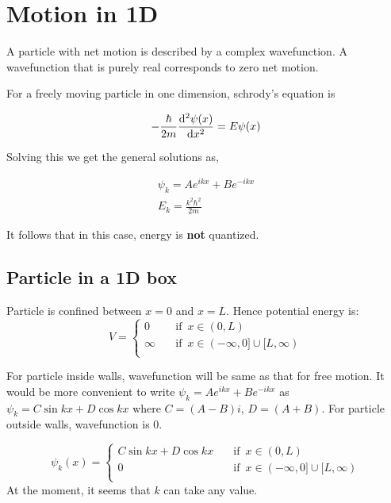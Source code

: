 \documentclass[11pt]{article}
\theoremstyle{definition}
\begin{document}
\section{Motion in 1D}

A particle with net motion is described by a complex wavefunction. A wavefunction that is purely real corresponds to zero net motion.

For a freely moving particle in one dimension, schrody's equation is

\begin{shaded}
\begin{equation*}
    - \frac{\hbar}{2m} \dv[2]{\psi(x)}{x} = E \psi(x)
\end{equation*}

Solving this we get the general solutions as,

\begin{gather*}
    \psi_k = Ae^{ikx} + Be^{-ikx}\\
    E_k = \frac{k^2 \hbar^2}{2m}
\end{gather*}
\end{shaded}

It follows that in this case, energy is \textbf{not} quantized.

\subsection{Particle in a 1D box}

Particle is confined between $x=0$ and $x=L$. Hence potential energy is:
\begin{equation*}
V=\begin{cases}
          0 \quad &\text{if } \, x \in (0,L) \\
          \infty \quad &\text{if } \, x \in (-\infty,0] \cup [L, \infty) \\
     \end{cases}
\end{equation*}

For particle inside walls, wavefunction will be same as that for free motion. It would be more convenient to write $\psi_k =Ae^{ikx} + Be^{-ikx}$ as $\psi_k = C\sin{kx} + D \cos{kx}$ where $C = (A-B)i$, $D = (A+B)$. For particle outside walls, wavefunction is 0.

\begin{equation*}
\psi_k(x) =\begin{cases}
          C\sin{kx} + D \cos{kx} \quad &\text{if } \, x \in (0,L) \\
          0 \quad &\text{if } \, x \in (-\infty,0] \cup [L, \infty) \\
     \end{cases}
\end{equation*}
At the moment, it seems that $k$ can take any value.
\end{document}
